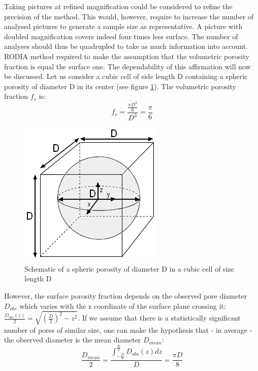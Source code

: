Taking pictures at refined magnification could be considered to refine the precision of the method. This would, however, require to increase the number of analysed pictures to generate a sample size as representative. A picture with doubled magnification covers indeed four times less surface. The number of analyses should thus be quadrupled to take as much information into account.\\

RODIA method required to make the assumption that the volumetric porosity fraction is equal the surface one. The dependability of this affirmation will now be discussed. Let us consider a cubic cell of side length D containing a spheric porosity of diameter D in its center (see figure \ref{fig:DDD}). The volumetric porosity fraction $f_v$ is:\\

$$f_v = \frac{\frac{\pi D^3}{6}}{D^3}= \frac{\pi}{6}$$

\begin{figure}[ht]
	\centering
	\centerline{\includegraphics[scale=0.64]{Images/DDD}}
	\decoRule
	\caption[Schematic of a spheric porosity of diameter D in a cubic cell of size length D]{Schematic of a spheric porosity of diameter D in a cubic cell of size length D}
	\label{fig:DDD}
\end{figure}

However, the surface porosity fraction depends on the observed pore diameter $D_{obs}$ which varies with the z coordinate of the surface plane crossing it: $\frac{D_{obs}(z)}{2}=\sqrt{(\frac{D}{2})^2-z^2}$. If we assume that there is a statistically significant number of pores of similar size, one can make the hypothesis that - in average - the observed diameter is the mean diameter $D_{mean}$:\\

$$ \frac{D_{mean}}{2}= \frac{\int_{-\frac{D}{2}}^\frac{D}{2} D_{obs}(z) dz}{D}=\frac{\pi D}{8}$$

